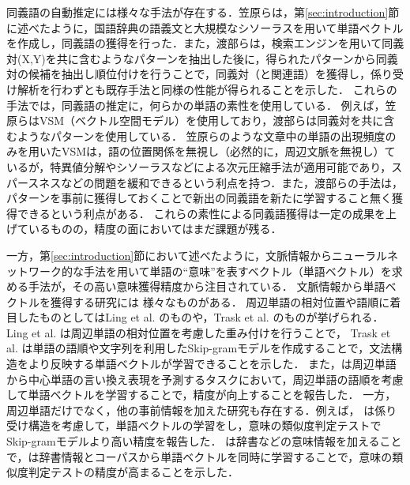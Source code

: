 \documentclass[japanese]{jnlp_1.4}
\begin{document}
同義語の自動推定には様々な手法が存在する．笠原ら\citeyear{kato}は，第\ref{sec:introduction}節に述べたように，国語辞典の語義文と大規模なシソーラスを用いて単語ベクトルを作成し，同義語の獲得を行った．また，渡部ら\citeyear{watanabe}は，検索エンジンを用いて同義対(X,Y)を共に含むようなパターンを抽出した後に，得られたパターンから同義対の候補を抽出し順位付けを行うことで，同義対（と関連語）を獲得し，係り受け解析を行わずとも既存手法と同様の性能が得られることを示した．
これらの手法では，同義語の推定に，何らかの単語の素性を使用している．
例えば，笠原ら\citeyear{kato}はVSM（ベクトル空間モデル）を使用しており，渡部ら\citeyear{watanabe}は同義対を共に含むようなパターンを使用している．
笠原ら\citeyear{kato}のような文章中の単語の出現頻度のみを用いたVSMは，語の位置関係を無視し（必然的に，周辺文脈を無視し）ているが，特異値分解やシソーラスなどによる次元圧縮手法が適用可能であり，スパースネスなどの問題を緩和できるという利点を持つ．また，渡部ら\citeyear{watanabe}の手法は，パターンを事前に獲得しておくことで新出の同義語を新たに学習すること無く獲得できるという利点がある．
これらの素性による同義語獲得は一定の成果を上げているものの，精度の面においてはまだ課題が残る．

一方，第\ref{sec:introduction}節において述べたように，文脈情報からニューラルネットワーク的な手法を用いて単語の``意味''を表すベクトル（単語ベクトル）を求める手法が，その高い意味獲得精度から注目されている\cite{roy}．
文脈情報から単語ベクトルを獲得する研究には
様々なものがある．
周辺単語の相対位置や語順に着目したものとしてはLing et al. \cite{ling}のものや，Trask et al. \cite{trask}のものが挙げられる．
Ling et al. \citeyear{ling}は周辺単語の相対位置を考慮した重み付けを行うことで，
Trask et al. \citeyear{trask}は単語の語順や文字列を利用したSkip-gramモデルを作成することで，文法構造をより反映する単語ベクトルが学習できることを示した．
また，は周辺単語から中心単語の言い換え表現を予測するタスクにおいて，周辺単語の語順を考慮して単語ベクトルを学習することで，精度が向上することを報告した．
一方，周辺単語だけでなく，他の事前情報を加えた研究も存在する．例えば，
は係り受け構造を考慮して，単語ベクトルの学習をし，意味の類似度判定テストでSkip-gramモデルより高い精度を報告した．
は辞書などの意味情報を加えることで，は辞書情報とコーパスから単語ベクトルを同時に学習することで，意味の類似度判定テストの精度が高まることを示した．
\end{document}
